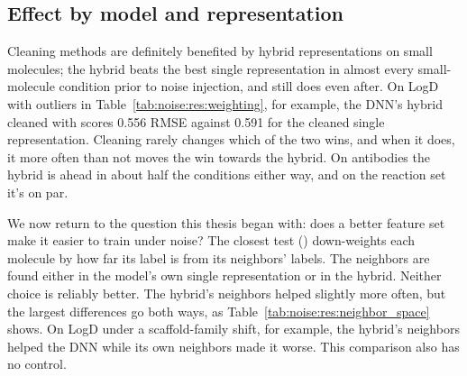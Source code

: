 \subsection{Effect by model and representation}\label{sec:noise:res:repr}

Cleaning methods are definitely benefited by hybrid representations on small molecules; the hybrid beats the best single representation in almost every small-molecule condition prior to noise injection, and still does even after. On LogD with outliers in Table~\ref{tab:noise:res:weighting}, for example, the DNN's hybrid cleaned with  scores 0.556 RMSE against 0.591 for the cleaned single representation. Cleaning rarely changes which of the two wins, and when it does, it more often than not moves the win towards the hybrid. On antibodies the hybrid is ahead in about half the conditions either way, and on the reaction set it's on par.

We now return to the question this thesis began with: does a better feature set make it easier to train under noise? The closest test () down-weights each molecule by how far its label is from its neighbors' labels. The neighbors are found either in the model's own single representation or in the hybrid. Neither choice is reliably better. The hybrid's neighbors helped slightly more often, but the largest differences go both ways, as Table~\ref{tab:noise:res:neighbor_space} shows. On LogD under a scaffold-family shift, for example, the hybrid's neighbors helped the DNN while its own neighbors made it worse. This comparison also has no control.

